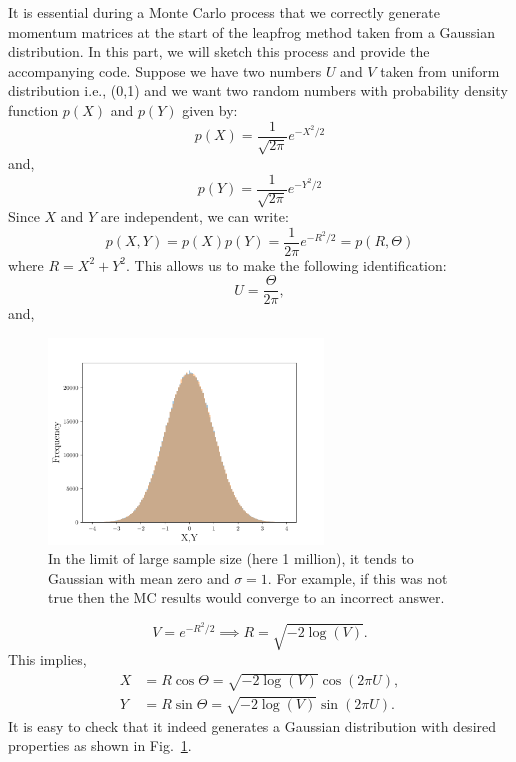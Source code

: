 \documentclass[11pt]{article}
\newcommand{\PY}{\textsc{Python}}
\begin{document}
It is essential during a Monte Carlo process that we correctly generate momentum matrices at the start of the leapfrog method taken from a Gaussian distribution. In this part, we will sketch this process and provide the accompanying code. 
Suppose we have two numbers $U$ and $V$ taken from uniform distribution i.e., (0,1) 
and we want two random numbers with probability density function $p(X)$ and $p(Y)$ given by:
\begin{equation}
	p(X) = \frac{1}{\sqrt{2\pi}} e^{-X^2/2} 
\end{equation}
and, 
\begin{equation}
	p(Y) = \frac{1}{\sqrt{2\pi}} e^{-Y^2/2} 
\end{equation}
Since $X$ and $Y$ are independent, we can write:
\begin{equation}
	p(X,Y) = p(X) p(Y) = \frac{1}{2\pi} e^{-R^2/2} = p(R, \Theta) 
\end{equation}
where $R = X^2 + Y^2$. This allows us to make the following identification:
\begin{equation}
	U = \frac{\Theta}{2\pi}, 
\end{equation}
and, 

\begin{figure}[htbp] 
	\centering 
	\includegraphics[width=0.65\textwidth]{figs/testRN.pdf}
	\caption{\label{fig:RN}In the limit of large sample size (here 1 million), 
	it tends to Gaussian with mean zero and $\sigma=1$. For example, if 
	this was not true then the MC results would converge to an incorrect answer.}
\end{figure}
\begin{equation}
	V = e^{-R^2/2} \implies R = \sqrt{-2 \log(V)}. 
\end{equation}
This implies, 
\begin{align}
	X &= R \cos \Theta = \sqrt{-2 \log(V)} \cos(2 \pi U), \\
	Y &= R \sin \Theta = \sqrt{-2 \log(V)} \sin(2 \pi U).
\end{align}
%
It is easy to check that it indeed generates a 
Gaussian distribution with desired properties as shown in Fig.~\ref{fig:RN}. 
\end{document}
